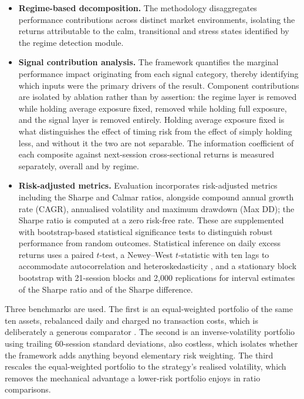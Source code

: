 \documentclass{singlecol-new}
\theoremstyle{TH}{
\newtheorem{lemma}{Lemma}
\newtheorem{theorem}[lemma]{Theorem}
\newtheorem{corrolary}[lemma]{Corrolary}
\newtheorem{conjecture}[lemma]{Conjecture}
\newtheorem{proposition}[lemma]{Proposition}
\newtheorem{claim}[lemma]{Claim}
\newtheorem{stheorem}[lemma]{Wrong Theorem}
\newtheorem{algorithm}{Algorithm}
}
\theoremstyle{THrm}{
\newtheorem{definition}{Definition}[section]
\newtheorem{question}{Question}[section]
\newtheorem{remark}{Remark}
\newtheorem{scheme}{Scheme}
}
\theoremstyle{THhit}{
\newtheorem{case}{Case}[section]
}
\begin{document}
\begin{itemize}
\item \textbf{Regime-based decomposition.} The methodology disaggregates performance
contributions across distinct market environments, isolating the returns attributable to
the calm, transitional and stress states identified by the regime detection module.
\item \textbf{Signal contribution analysis.} The framework quantifies the marginal
performance impact originating from each signal category, thereby identifying which
inputs were the primary drivers of the result. Component contributions are isolated by
ablation rather than by assertion: the regime layer is removed while holding average
exposure fixed, removed while holding full exposure, and the signal layer is removed
entirely. Holding average exposure fixed is what distinguishes the effect of timing risk
from the effect of simply holding less, and without it the two are not separable. The
information coefficient of each composite against next-session cross-sectional returns is
measured separately, overall and by regime.
\item \textbf{Risk-adjusted metrics.} Evaluation incorporates risk-adjusted metrics
including the Sharpe and Calmar ratios, alongside compound annual growth rate (CAGR),
annualised volatility and maximum drawdown (Max DD); the Sharpe ratio is computed at a
zero risk-free rate. These are supplemented with bootstrap-based statistical significance
tests to distinguish robust performance from random outcomes. Statistical inference on
daily excess returns uses a paired $t$-test, a Newey--West $t$-statistic with ten lags to
accommodate autocorrelation and heteroskedasticity \citep{newey87}, and a stationary block
bootstrap with 21-session blocks and 2{,}000 replications \citep{politis94} for interval
estimates of the Sharpe ratio and of the Sharpe difference.
\end{itemize}

Three benchmarks are used. The first is an equal-weighted portfolio of the same ten
assets, rebalanced daily and charged no transaction costs, which is deliberately a
generous comparator \citep{demiguel09}. The second is an inverse-volatility portfolio
using trailing 60-session standard deviations, also costless, which isolates whether the
framework adds anything beyond elementary risk weighting. The third rescales the
equal-weighted portfolio to the strategy's realised volatility, which removes the
mechanical advantage a lower-risk portfolio enjoys in ratio comparisons.
\end{document}
